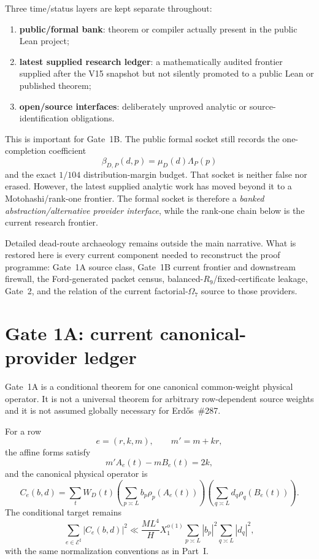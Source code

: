 \documentclass[11pt]{article}
\theoremstyle{definition}
\newcommand{\1}{\mathbf 1}
\begin{document}
Three time/status layers are kept separate throughout:
\begin{enumerate}[leftmargin=1.7em]
\item \textbf{public/formal bank}: theorem or compiler actually present in the public Lean
  project;
\item \textbf{latest supplied research ledger}: a mathematically audited frontier supplied
  after the V15 snapshot but not silently promoted to a public Lean or published theorem;
\item \textbf{open/source interfaces}: deliberately unproved analytic or source-identification
  obligations.
\end{enumerate}

This is important for Gate~1B.  The public formal socket still records the one-completion
coefficient
\[
\beta_{D,P}(d,p)=\mu_D(d)\Lambda_P(p)
\]
and the exact $1/104$ distribution-margin budget.  That socket is neither false nor erased.
However, the latest supplied analytic work has moved beyond it to a Motohashi/rank-one
frontier.  The formal socket is therefore a \emph{banked abstraction/alternative provider
interface}, while the rank-one chain below is the current research frontier.

Detailed dead-route archaeology remains outside the main narrative.  What is restored here
is every current component needed to reconstruct the proof programme: Gate~1A source class,
Gate~1B current frontier and downstream firewall, the Ford-generated packet census,
balanced-$R_9$/fixed-certificate leakage, Gate~2, and the relation of the current
factorial-$\Omega_7$ source to those providers.

\section{Gate 1A: current canonical-provider ledger}
\label{sec:gate1a-ledger}

Gate~1A is a conditional theorem for one canonical common-weight physical operator.  It is
not a universal theorem for arbitrary row-dependent source weights and it is not assumed
globally necessary for Erd\H{o}s~\#287.

For a row
\[
e=(r,k,m),\qquad m'=m+kr,
\]
the affine forms satisfy
\[
m'A_e(t)-mB_e(t)=2k,
\]
and the canonical physical operator is
\[
C_e(b,d)=
\sum_tW_D(t)
\left(\sum_{p\asymp L}b_p\rho_p(A_e(t))\right)
\left(\sum_{q\asymp L}d_q\rho_q(B_e(t))\right).
\]
The conditional target remains
\[
\sum_{e\in\mathcal E^\sharp}|C_e(b,d)|^2
\ll
\frac{ML^4}{H}X_1^{o(1)}
\sum_{p\asymp L}|b_p|^2
\sum_{q\asymp L}|d_q|^2,
\]
with the same normalization conventions as in Part~I.
\end{document}
